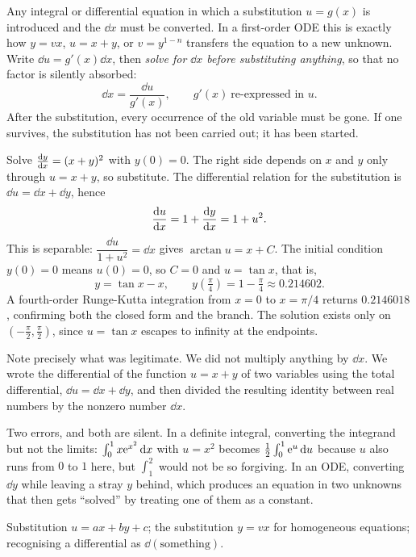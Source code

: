 \cue Any integral or differential equation in which a substitution $u=g(x)$ is introduced and the $\dd x$ must be converted. In a first-order ODE this is exactly how $y=vx$, $u=x+y$, or $v=y^{1-n}$ transfers the equation to a new unknown.
\method Write $\dd u=g'(x)\dd x$, then \emph{solve for $\dd x$ before substituting anything}, so that no factor is silently absorbed:
\[\dd x=\frac{\dd u}{g'(x)},\qquad g'(x)\ \text{re-expressed in }u.\]
After the substitution, every occurrence of the old variable must be gone. If one survives, the substitution has not been carried out; it has been started.

\begin{worked}
Solve $\frac{\mathrm{d}y}{\mathrm{d}x}=(x+y)^{2}$ with $y(0)=0$. The right side depends on $x$ and $y$ only through $u=x+y$, so substitute. The differential relation for the substitution is $\dd u=\dd x+\dd y$, hence
\[\frac{\mathrm{d}u}{\mathrm{d}x}=1+\frac{\mathrm{d}y}{\mathrm{d}x}=1+u^{2}.\]
This is separable: $\dfrac{\dd u}{1+u^{2}}=\dd x$ gives $\arctan u=x+C$. The initial condition $y(0)=0$ means $u(0)=0$, so $C=0$ and $u=\tan x$, that is,
\[y=\tan x-x,\qquad y(\tfrac{\pi}{4})=1-\tfrac{\pi}{4}\approx0.214602.\]
A fourth-order Runge-Kutta integration from $x=0$ to $x=\pi/4$ returns $0.2146018$, confirming both the closed form and the branch. The solution exists only on $(-\tfrac\pi2,\tfrac\pi2)$, since $u=\tan x$ escapes to infinity at the endpoints.

Note precisely what was legitimate. We did not multiply anything by $\dd x$. We wrote the differential of the function $u=x+y$ of two variables using the total differential, $\dd u=\dd x+\dd y$, and then divided the resulting identity between real numbers by the nonzero number $\dd x$.
\end{worked}

\begin{trap}
Two errors, and both are silent. In a definite integral, converting the integrand but not the limits: $\int_0^{1}x\mathrm{e}^{x^{2}}\,\mathrm{d} x$ with $u=x^{2}$ becomes $\tfrac12\int_0^{1}\mathrm{e}^{u}\,\mathrm{d} u$ because $u$ also runs from $0$ to $1$ here, but $\int_1^{2}$ would not be so forgiving. In an ODE, converting $\dd y$ while leaving a stray $y$ behind, which produces an equation in two unknowns that then gets ``solved'' by treating one of them as a constant.
\end{trap}

\begin{seealsob}Substitution $u=ax+by+c$; the substitution $y=vx$ for homogeneous equations; recognising a differential as $\dd(\text{something})$.\end{seealsob}


